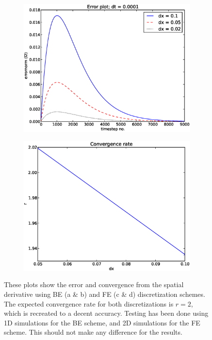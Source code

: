 \begin{figure}[H]
  \begin{subfigure}{0.49\textwidth}
  \includegraphics[width=\textwidth]{../results/experiment_22052014_0810_spatial_convergencetest_FE2D/results/errorplot.eps}
  \caption{}
 \end{subfigure}
 \begin{subfigure}{0.49\textwidth}
  \includegraphics[width=\textwidth]{../results/experiment_22052014_0810_spatial_convergencetest_FE2D/results/ConvergenceTest.eps}
  \caption{}
 \end{subfigure}
 \caption[Spatial error tests]{These plots show the error and convergence from the spatial derivative using BE (a \& b) and FE (c \& d) discretization schemes. The expected convergence rate for both discretizations is $r = 2$, which is recreated to a decent accuracy. Testing has been done using 1D simulations for the BE scheme, and 2D simulations for the FE scheme. This should not make any difference for the results.}
 \label{analysis:spatial_convergence_tests}
\end{figure}


